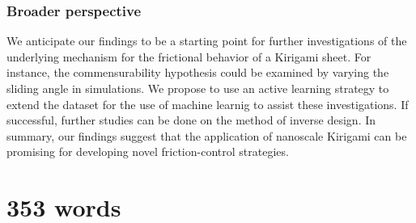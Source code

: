 \subsubsection*{Broader perspective}
We anticipate our findings to be a starting point for further investigations of the underlying mechanism for the frictional behavior of a Kirigami sheet. For instance, the commensurability hypothesis could be examined by varying the sliding angle in simulations. We propose to use an active learning strategy to extend the dataset for the use of machine learnig to assist these investigations. If successful, further studies can be done on the method of inverse design. In summary, our findings suggest that the application of nanoscale Kirigami can be promising for developing novel friction-control strategies.

\newpage

\section*{353 words}

